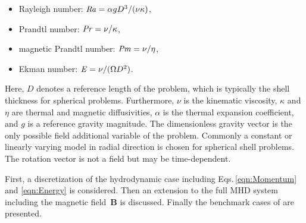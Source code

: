 \begin{itemize}
	\item Rayleigh number: $\mathit{Ra}=\alpha g D^3/(\nu\kappa)$,
	\item Prandtl number: $\mathit{Pr}=\nu/\kappa$,
	\item magnetic Prandtl number: $\mathit{Pm}=\nu/\eta$,
	\item Ekman number:	$\mathit{E}=\nu/(\Omega D^2)$.
\end{itemize}
Here, $D$ denotes a reference length of the problem, which is typically the shell thickness for spherical problems. Furthermore, $\nu$ is the kinematic viscosity, $\kappa$ and $\eta$ are thermal and magnetic diffusivities, $\alpha$ is the thermal expansion coefficient, and $g$ is a reference gravity magnitude. The dimensionless gravity vector is the only possible field additional variable of the problem. Commonly a constant or linearly varying model in radial direction is chosen for spherical shell problems. The rotation vector is not a field but may be time-dependent. 

First, a discretization of the hydrodynamic case including Eqs.\,\eqref{eqn:Momentum} and \eqref{eqn:Energy} is considered. Then an extension to the full MHD system including the magnetic field~$\bm{B}$ is discussed. Finally the benchmark cases of \citeauthor{Christensen2001} are presented. 
